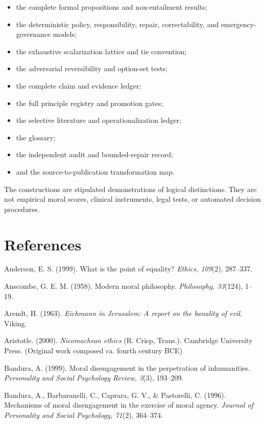 \documentclass[
  11pt,
]{article}
\providecommand{\tightlist}{%
  \setlength{\itemsep}{0pt}\setlength{\parskip}{0pt}}
\begin{document}
\begin{itemize}
\tightlist
\item
  the complete formal propositions and non-entailment results;
\item
  the deterministic policy, responsibility, repair, correctability, and
  emergency-governance models;
\item
  the exhaustive scalarization lattice and tie convention;
\item
  the adversarial reversibility and option-set tests;
\item
  the complete claim and evidence ledger;
\item
  the full principle registry and promotion gates;
\item
  the selective literature and operationalization ledger;
\item
  the glossary;
\item
  the independent audit and bounded-repair record;
\item
  and the source-to-publication transformation map.
\end{itemize}

The constructions are stipulated demonstrations of logical distinctions.
They are not empirical moral scores, clinical instruments, legal tests,
or automated decision procedures.

\section{References}\label{references}

Anderson, E. S. (1999). What is the point of equality? \emph{Ethics,
109}(2), 287--337.

Anscombe, G. E. M. (1958). Modern moral philosophy. \emph{Philosophy,
33}(124), 1--19.

Arendt, H. (1963). \emph{Eichmann in Jerusalem: A report on the banality
of evil}. Viking.

Aristotle. (2000). \emph{Nicomachean ethics} (R. Crisp, Trans.).
Cambridge University Press. (Original work composed ca. fourth century
BCE)

Bandura, A. (1999). Moral disengagement in the perpetration of
inhumanities. \emph{Personality and Social Psychology Review, 3}(3),
193--209.

Bandura, A., Barbaranelli, C., Caprara, G. V., \& Pastorelli, C. (1996).
Mechanisms of moral disengagement in the exercise of moral agency.
\emph{Journal of Personality and Social Psychology, 71}(2), 364--374.
\end{document}
